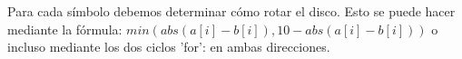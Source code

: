 
Para cada símbolo debemos determinar cómo rotar el disco. Esto se puede hacer mediante la fórmula: $min(abs(a[i]-b[i]),10-abs(a[i]-b[i]))$ o incluso mediante los dos ciclos 'for': en ambas direcciones.

